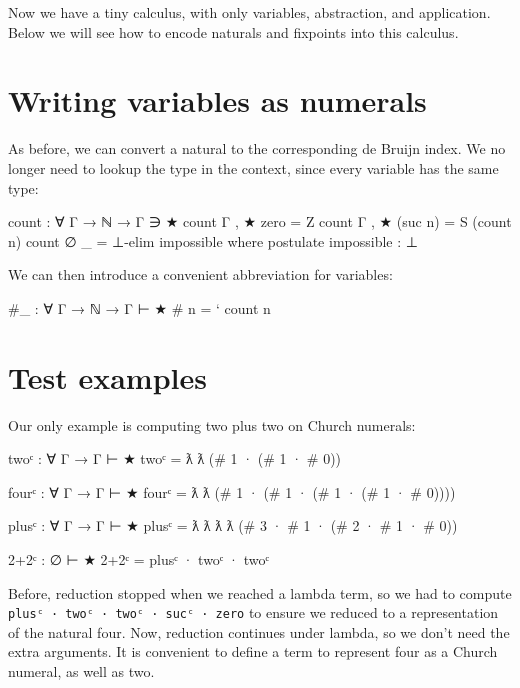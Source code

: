 Now we have a tiny calculus, with only variables, abstraction, and
application. Below we will see how to encode naturals and fixpoints into
this calculus.

\hypertarget{writing-variables-as-numerals}{%
\section{Writing variables as
numerals}\label{writing-variables-as-numerals}}

As before, we can convert a natural to the corresponding de Bruijn
index. We no longer need to lookup the type in the context, since every
variable has the same type:

\begin{fence}
\begin{code}
count : ∀ {Γ} → ℕ → Γ ∋ ★
count {Γ , ★} zero     =  Z
count {Γ , ★} (suc n)  =  S (count n)
count {∅}     _        =  ⊥-elim impossible
  where postulate impossible : ⊥
\end{code}
\end{fence}

We can then introduce a convenient abbreviation for variables:

\begin{fence}
\begin{code}
#_ : ∀ {Γ} → ℕ → Γ ⊢ ★
# n  =  ` count n
\end{code}
\end{fence}

\hypertarget{test-examples}{%
\section{Test examples}\label{test-examples}}

Our only example is computing two plus two on Church numerals:

\begin{fence}
\begin{code}
twoᶜ : ∀ {Γ} → Γ ⊢ ★
twoᶜ = ƛ ƛ (# 1 · (# 1 · # 0))

fourᶜ : ∀ {Γ} → Γ ⊢ ★
fourᶜ = ƛ ƛ (# 1 · (# 1 · (# 1 · (# 1 · # 0))))

plusᶜ : ∀ {Γ} → Γ ⊢ ★
plusᶜ = ƛ ƛ ƛ ƛ (# 3 · # 1 · (# 2 · # 1 · # 0))

2+2ᶜ : ∅ ⊢ ★
2+2ᶜ = plusᶜ · twoᶜ · twoᶜ
\end{code}
\end{fence}

Before, reduction stopped when we reached a lambda term, so we had to
compute
\texttt{plusᶜ\ ·\ twoᶜ\ ·\ twoᶜ\ ·\ sucᶜ\ ·\ \textasciigrave{}zero} to
ensure we reduced to a representation of the natural four. Now,
reduction continues under lambda, so we don't need the extra arguments.
It is convenient to define a term to represent four as a Church numeral,
as well as two.

